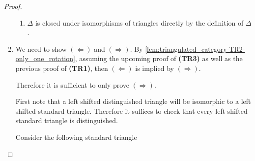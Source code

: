 \begin{proof}
\begin{enumerate}[label={(\bfseries TR\arabic*)}]
{\begin{enumerate}
{\begin{center}
                    \end{center}
                    Since the pushout of an isomorphism is an isomorphism, \( \gamma_{\Id} \) is an isomorphism, which implies \( C_{\Id} \cong 0 \) in \( \Mc \) because all injective modules are projective in \( \Mc \).
                }
                \item {
                    \( \Delta \) is closed under isomorphisms of triangles directly by the definition of \( \Delta \).
                }
            \end{enumerate}
        }
        \item {
            We need to show \( (\Leftarrow) \) and \( (\Rightarrow) \). By \autoref{lem:triangulated_category-TR2-only_one_rotation}, assuming the upcoming proof of {\bf (TR3)} as well as the previous proof of {\bf (TR1)}, then \( (\Leftarrow) \) is implied by \( (\Rightarrow) \).
            
            Therefore it is sufficient to only prove \( (\Rightarrow) \).

            First note that a left shifted distinguished triangle will be isomorphic to a left shifted standard triangle. Therefore it suffices to check that every left shifted standard triangle is distinguished.

            Consider the following standard triangle
            \begin{center}
            \end{center}

}
\end{enumerate}
\end{proof}
